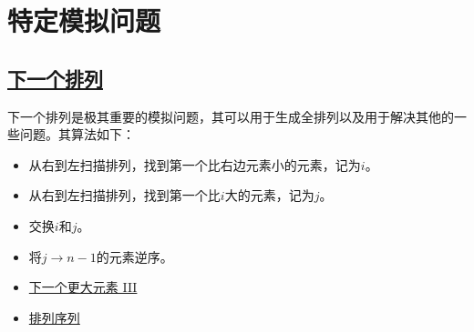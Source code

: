 \documentclass[../../main.tex]{subfiles}
\begin{document}
\section{特定模拟问题}

\subsection{\href{https://leetcode.cn/problems/next-permutation/}{下一个排列}}

下一个排列是极其重要的模拟问题，其可以用于生成全排列以及用于解决其他的一些问题。其算法如下：

\begin{itemize}
  \item 从右到左扫描排列，找到第一个比右边元素小的元素，记为$i$。
  \item 从右到左扫描排列，找到第一个比$i$大的元素，记为$j$。
  \item 交换$i$和$j$。
  \item 将$j \to n - 1$的元素逆序。
\end{itemize}



\begin{kaobox}[title=类似题目]
  \begin{itemize}
    \item \href{https://leetcode-cn.com/problems/next-greater-element-iii/}{下一个更大元素 III}
    \item \href{https://leetcode.cn/problems/permutation-sequence/}{排列序列}
  \end{itemize}
\end{kaobox}
\end{document}

